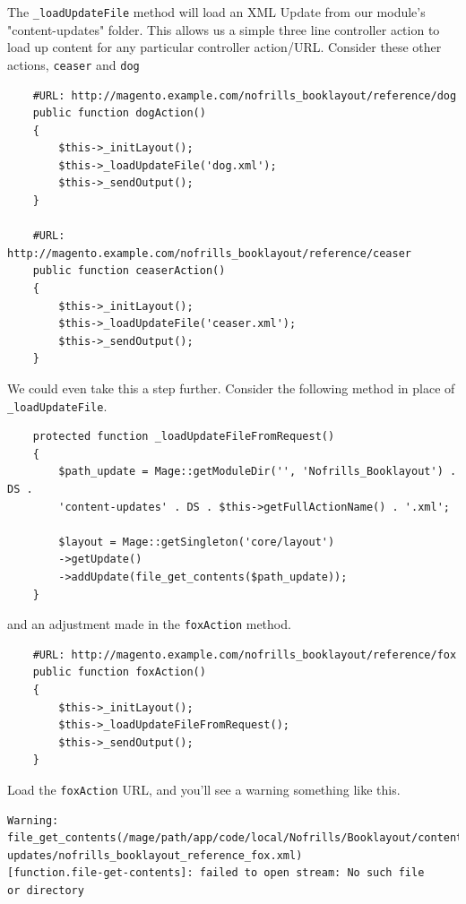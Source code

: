 \documentclass[oneside]{book}
\begin{document}
The \footnotesize\texttt{\_loadUpdateFile} \normalsize  method will load an XML Update from our module's "content-updates" folder.  This allows us a simple three line controller action to load up content for any particular controller action/URL.  Consider these other actions, \footnotesize\texttt{ceaser} \normalsize  and \footnotesize\texttt{dog} \normalsize

\begin{lstlisting}
    #URL: http://magento.example.com/nofrills_booklayout/reference/dog
    public function dogAction()
    {
        $this->_initLayout();
        $this->_loadUpdateFile('dog.xml');
        $this->_sendOutput();
    }

    #URL: http://magento.example.com/nofrills_booklayout/reference/ceaser
    public function ceaserAction()
    {
        $this->_initLayout();
        $this->_loadUpdateFile('ceaser.xml');
        $this->_sendOutput();
    }

\end{lstlisting}


We could even take this a step further.  Consider the following method in place of \footnotesize\texttt{\_loadUpdateFile}\normalsize.

\begin{lstlisting}
    protected function _loadUpdateFileFromRequest()
    {
        $path_update = Mage::getModuleDir('', 'Nofrills_Booklayout') . DS .
        'content-updates' . DS . $this->getFullActionName() . '.xml';

        $layout = Mage::getSingleton('core/layout')
        ->getUpdate()
        ->addUpdate(file_get_contents($path_update));
    }

\end{lstlisting}


and an adjustment made in the \footnotesize\texttt{foxAction} \normalsize  method.

\begin{lstlisting}
    #URL: http://magento.example.com/nofrills_booklayout/reference/fox
    public function foxAction()
    {
        $this->_initLayout();
        $this->_loadUpdateFileFromRequest();
        $this->_sendOutput();
    }

\end{lstlisting}


Load the \footnotesize\texttt{foxAction} \normalsize  URL, and you'll see a warning something like this.

\begin{lstlisting}
Warning: file_get_contents(/mage/path/app/code/local/Nofrills/Booklayout/content-
updates/nofrills_booklayout_reference_fox.xml)
[function.file-get-contents]: failed to open stream: No such file
or directory

\end{lstlisting}
\end{document}
